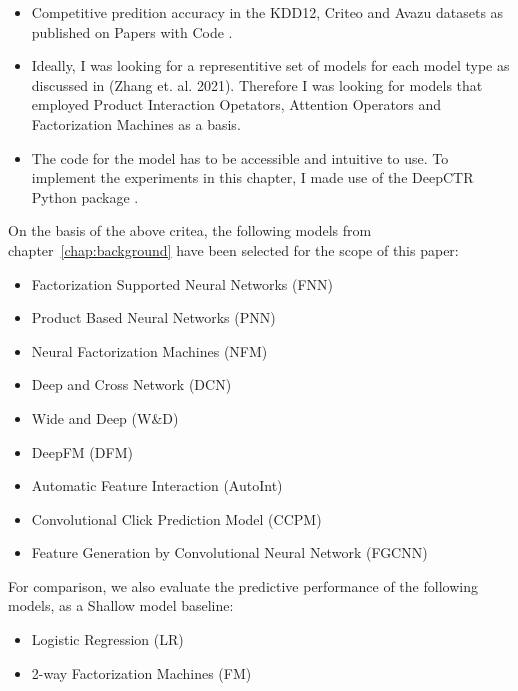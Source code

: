 \documentclass{mldsmsc}
\begin{document}
\begin{itemize}
\item Competitive predition accuracy in the KDD12, Criteo and Avazu datasets as published on Papers with Code \citep{RefWorks:2024papers}.
\item Ideally, I was looking for a representitive set of models for each model type as discussed in (Zhang et. al. 2021). Therefore I was looking for models that employed Product Interaction Opetators, Attention Operators and Factorization Machines as a basis.
\item The code for the model has to be accessible and intuitive to use. To implement the experiments
in this chapter, I made use of the DeepCTR Python package \citep{RefWorks:shen2017deepctr:}.
\end{itemize}

On the basis of the above critea, the following models from chapter~\ref{chap:background} have been selected for the scope of this paper:

\begin{itemize}
\item Factorization Supported Neural Networks (FNN) \citep{RefWorks:zhang2016deep}
\item Product Based Neural Networks (PNN) \citep{RefWorks:qu2016product-based}
\item Neural Factorization Machines (NFM) \citep{RefWorks:he2017neural}
\item Deep and Cross Network (DCN) \citep{RefWorks:wang2017deep}
\item Wide and Deep (W\&D) \citep{RefWorks:cheng2016wide}
\item DeepFM (DFM) \citep{RefWorks:guo2017deepfm:}
\item Automatic Feature Interaction (AutoInt) \citep{RefWorks:song2019autoint}
\item Convolutional Click Prediction Model (CCPM) \citep{RefWorks:liu2015convolutional}
\item Feature Generation by Convolutional Neural Network (FGCNN) \citep{RefWorks:liu2019feature}
\end{itemize}

For comparison, we also evaluate the predictive performance of the following models, as a Shallow model baseline:

\begin{itemize}
    \item Logistic Regression (LR) \citep{RefWorks:richardson2007predicting}
    \item 2-way Factorization Machines (FM) \citep{RefWorks:rendle2010factorization}
\end{itemize}
\end{document}

